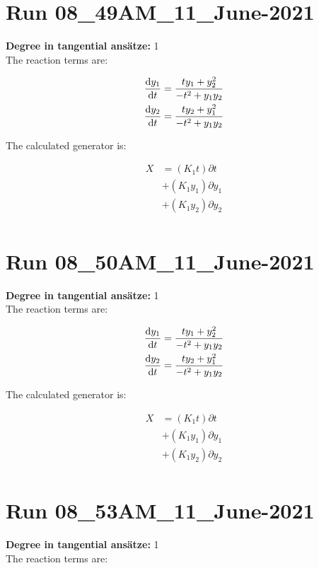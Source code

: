 \section*{Run 08\_49AM\_11\_June-2021}
\textbf{Degree in tangential ansätze:}	1\\
The reaction terms are:

\begin{align*}
\dv{y_{1}}{t}&=\frac{t y_{1} + y_{2}^{2}}{- t^{2} + y_{1} y_{2}}\\
\dv{y_{2}}{t}&=\frac{t y_{2} + y_{1}^{2}}{- t^{2} + y_{1} y_{2}}\\
\end{align*}

The calculated generator is:

\begin{align*}
X&=\left(K_{1} t\right)\partial t\\&+\left(K_{1} y_{1}\right)\partial y_{1}\\&+\left(K_{1} y_{2}\right)\partial y_{2}\\\end{align*}
\section*{Run 08\_50AM\_11\_June-2021}
\textbf{Degree in tangential ansätze:}	1\\
The reaction terms are:

\begin{align*}
\dv{y_{1}}{t}&=\frac{t y_{1} + y_{2}^{2}}{- t^{2} + y_{1} y_{2}}\\
\dv{y_{2}}{t}&=\frac{t y_{2} + y_{1}^{2}}{- t^{2} + y_{1} y_{2}}\\
\end{align*}

The calculated generator is:

\begin{align*}
X&=\left(K_{1} t\right)\partial t\\&+\left(K_{1} y_{1}\right)\partial y_{1}\\&+\left(K_{1} y_{2}\right)\partial y_{2}\\\end{align*}
\section*{Run 08\_53AM\_11\_June-2021}
\textbf{Degree in tangential ansätze:}	1\\
The reaction terms are:

